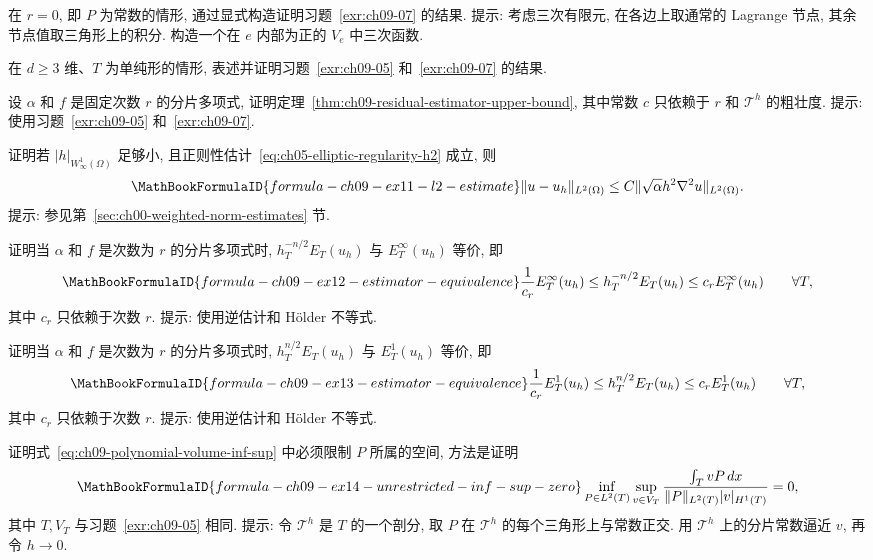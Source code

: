 \begin{MBExercise}
\label{exr:ch09-08}
在 $r=0$, 即 $P$ 为常数的情形, 通过显式构造证明习题~\ref{exr:ch09-07} 的结果. 提示: 考虑三次有限元, 在各边上取通常的 Lagrange 节点, 其余节点值取三角形上的积分. 构造一个在 $e$ 内部为正的 $V_e$ 中三次函数.
\end{MBExercise}

\begin{MBExercise}
\label{exr:ch09-09}
在 $d\geq3$ 维、$T$ 为单纯形的情形, 表述并证明习题~\ref{exr:ch09-05} 和~\ref{exr:ch09-07} 的结果.
\end{MBExercise}

\begin{MBExercise}
\label{exr:ch09-10}
设 $\alpha$ 和 $f$ 是固定次数 $r$ 的分片多项式, 证明定理~\ref{thm:ch09-residual-estimator-upper-bound}, 其中常数 $c$ 只依赖于 $r$ 和 $\mathcal T^h$ 的粗壮度. 提示: 使用习题~\ref{exr:ch09-05} 和~\ref{exr:ch09-07}.
\end{MBExercise}

\begin{MBExercise}
\label{exr:ch09-11}
证明若 $|h|_{W_\infty^1(\Omega)}$ 足够小, 且正则性估计~\eqref{eq:ch05-elliptic-regularity-h2} 成立, 则
\[
\MathBookFormulaID{formula-ch09-ex11-l2-estimate}
\|u-u_h\|_{L^2(\Omega)}\leq C\|\sqrt\alpha h^2\nabla^2u\|_{L^2(\Omega)}.
\]
提示: 参见第~\ref{sec:ch00-weighted-norm-estimates} 节.
\end{MBExercise}

\begin{MBExercise}
\label{exr:ch09-12}
证明当 $\alpha$ 和 $f$ 是次数为 $r$ 的分片多项式时, $h_T^{-n/2}E_T(u_h)$ 与 $E_T^\infty(u_h)$ 等价, 即
\[
\MathBookFormulaID{formula-ch09-ex12-estimator-equivalence}
\frac1{c_r}E_T^\infty(u_h)
\leq h_T^{-n/2}E_T(u_h)
\leq c_rE_T^\infty(u_h)
\qquad\forall T,
\]
其中 $c_r$ 只依赖于次数 $r$. 提示: 使用逆估计和 Hölder 不等式.
\end{MBExercise}

\begin{MBExercise}
\label{exr:ch09-13}
证明当 $\alpha$ 和 $f$ 是次数为 $r$ 的分片多项式时, $h_T^{n/2}E_T(u_h)$ 与 $E_T^1(u_h)$ 等价, 即
\[
\MathBookFormulaID{formula-ch09-ex13-estimator-equivalence}
\frac1{c_r}E_T^1(u_h)
\leq h_T^{n/2}E_T(u_h)
\leq c_rE_T^1(u_h)
\qquad\forall T,
\]
其中 $c_r$ 只依赖于次数 $r$. 提示: 使用逆估计和 Hölder 不等式.
\end{MBExercise}

\begin{MBExercise}
\label{exr:ch09-14}
证明式~\eqref{eq:ch09-polynomial-volume-inf-sup} 中必须限制 $P$ 所属的空间, 方法是证明
\[
\MathBookFormulaID{formula-ch09-ex14-unrestricted-inf-sup-zero}
\inf_{P\in L^2(T)}\sup_{v\in V_T}
\frac{\int_TvP\,dx}{\|P\|_{L^2(T)}|v|_{H^1(T)}}=0,
\]
其中 $T,V_T$ 与习题~\ref{exr:ch09-05} 相同. 提示: 令 $\mathcal T^h$ 是 $T$ 的一个剖分, 取 $P$ 在 $\mathcal T^h$ 的每个三角形上与常数正交. 用 $\mathcal T^h$ 上的分片常数逼近 $v$, 再令 $h\to0$.
\end{MBExercise}

